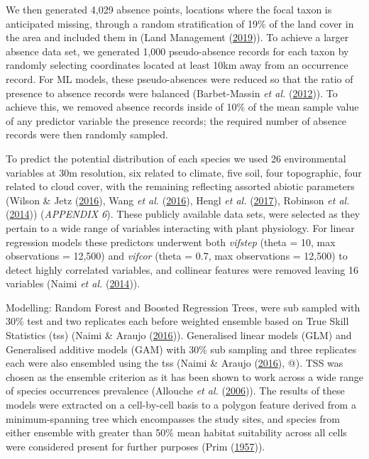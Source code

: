 \documentclass[
]{article}
\begin{document}
We then generated 4,029 absence points, locations where the focal taxon
is anticipated missing, through a random stratification of 19\% of the
land cover in the area and included them in (Land Management
(\protect\hyperlink{ref-aim2019database}{2019})). To achieve a larger
absence data set, we generated 1,000 pseudo-absence records for each
taxon by randomly selecting coordinates located at least 10km away from
an occurrence record. For ML models, these pseudo-absences were reduced
so that the ratio of presence to absence records were balanced
(Barbet-Massin \emph{et al.}
(\protect\hyperlink{ref-barbet2012selecting}{2012})). To achieve this,
we removed absence records inside of 10\% of the mean sample value of
any predictor variable the presence records; the required number of
absence records were then randomly sampled.

To predict the potential distribution of each species we used 26
environmental variables at 30m resolution, six related to climate, five
soil, four topographic, four related to cloud cover, with the remaining
reflecting assorted abiotic parameters (Wilson \& Jetz
(\protect\hyperlink{ref-wilson2016remotely}{2016}), Wang \emph{et al.}
(\protect\hyperlink{ref-wang2016locally}{2016}), Hengl \emph{et al.}
(\protect\hyperlink{ref-hengl2017soilgrids250m}{2017}), Robinson
\emph{et al.} (\protect\hyperlink{ref-robinson2014earthenv}{2014}))
(\emph{APPENDIX 6}). These publicly available data sets, were selected
as they pertain to a wide range of variables interacting with plant
physiology. For linear regression models these predictors underwent both
\emph{vifstep} (theta = 10, max observations = 12,500) and \emph{vifcor}
(theta = 0.7, max observations = 12,500) to detect highly correlated
variables, and collinear features were removed leaving 16 variables
(Naimi \emph{et al.} (\protect\hyperlink{ref-usdm2014}{2014})).

Modelling: Random Forest and Boosted Regression Trees, were sub sampled
with 30\% test and two replicates each before weighted ensemble based on
True Skill Statistics (tss) (Naimi \& Araujo
(\protect\hyperlink{ref-sdmPackage}{2016})). Generalised linear models
(GLM) and Generalised additive models (GAM) with 30\% sub sampling and
three replicates each were also ensembled using the tss (Naimi \& Araujo
(\protect\hyperlink{ref-sdmPackage}{2016}), @). TSS was chosen as the
ensemble criterion as it has been shown to work across a wide range of
species occurrences prevalence (Allouche \emph{et al.}
(\protect\hyperlink{ref-allouche2006assessing}{2006})). The results of
these models were extracted on a cell-by-cell basis to a polygon feature
derived from a minimum-spanning tree which encompasses the study sites,
and species from either ensemble with greater than 50\% mean habitat
suitability across all cells were considered present for further
purposes (Prim (\protect\hyperlink{ref-prim1957minimum}{1957})).
\end{document}
